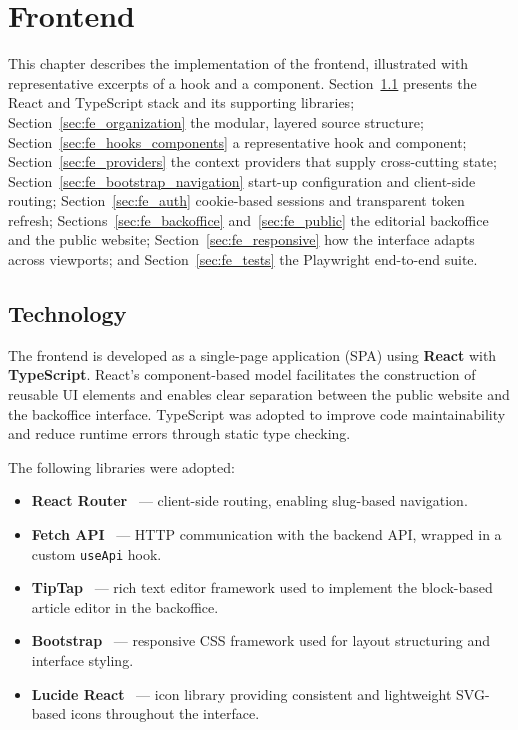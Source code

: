 %
%
\chapter{Frontend} \label{cap:frontend}

This chapter describes the implementation of the frontend, illustrated with representative
excerpts of a hook and a component. Section~\ref{sec:fe_technology} presents the React and
TypeScript stack and its supporting libraries; Section~\ref{sec:fe_organization} the modular,
layered source structure; Section~\ref{sec:fe_hooks_components} a representative hook and
component; Section~\ref{sec:fe_providers} the context providers that supply cross-cutting
state; Section~\ref{sec:fe_bootstrap_navigation} start-up configuration and client-side
routing; Section~\ref{sec:fe_auth} cookie-based sessions and transparent token refresh;
Sections~\ref{sec:fe_backoffice} and~\ref{sec:fe_public} the editorial backoffice and the
public website; Section~\ref{sec:fe_responsive} how the interface adapts across viewports;
and Section~\ref{sec:fe_tests} the Playwright end-to-end suite.

\section{Technology} \label{sec:fe_technology}

The frontend is developed as a single-page application (SPA) using \textbf{React}
with \textbf{TypeScript}. React's component-based model facilitates the construction
of reusable UI elements and enables clear separation between the public website and
the backoffice interface. TypeScript was adopted to improve code maintainability and
reduce runtime errors through static type checking.

The following libraries were adopted:

\begin{itemize}
      \item \textbf{React Router}~\cite{react_router} --- client-side routing, enabling
            slug-based navigation.

      \item \textbf{Fetch API}~\cite{mdn_fetch} --- HTTP communication with the backend
            API, wrapped in a custom \texttt{useApi} hook.

      \item \textbf{TipTap}~\cite{tiptap} --- rich text editor framework used to implement
            the block-based article editor in the backoffice.

      \item \textbf{Bootstrap}~\cite{bootstrap} --- responsive CSS framework used for
            layout structuring and interface styling.

      \item \textbf{Lucide React}~\cite{lucide} --- icon library providing consistent
            and lightweight SVG-based icons throughout the interface.
\end{itemize}

